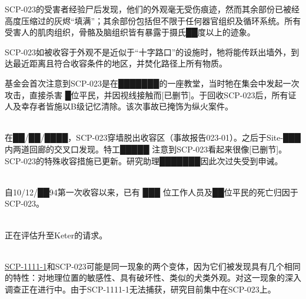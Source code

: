 SCP-023的受害者经验尸后发现，他们的外观毫无受伤痕迹，然而其余部份已被经高度压缩过的灰烬“填满”；其余部份包括但不限于任何器官组织及循环系统。所有受害人的肌肉组织，骨骼及脑组织皆有暴露于摄氏██度以上的迹象。

SCP-023如被收容于外观不是近似于“十字路口”的设施时，牠将能传跃出墙外，到达最近距离且符合收容条件的地区，并焚化路径上所有物质。

基金会首次注意到SCP-023是在███████的一座教堂，当时牠在集会中发起一次攻击，直接杀害 █位平民，并因视线接触而[已删节]。于回收SCP-023后，所有证人及幸存者皆施以B级记忆清除。该次事故已掩饰为纵火案件。

\\
在██\slash ██\slash ████，SCP-023穿墙脱出收容区（事故报告023-01）。之后于Site-███内两道回廊的交叉口发现。特工█████ 注意到SCP-023看起来很像[已删节]。SCP-023的特殊收容措施已更新。研究助理███████因此次过失受到申诫。

\\
自10\slash 12\slash ██94第一次收容以来，已有 ███ 位工作人员及██位平民的死亡归因于SCP-023。

\\
正在评估升至Keter的请求。

\\
\hyperref[chap:SCP-1111]{SCP-1111-1}和SCP-023可能是同一现象的两个变体，因为它们被发现具有几个相同的特性：对地理位置的敏感性、具有破坏性、类似的犬类外观。对这一现象的深入调查正在进行中。由于SCP-1111-1无法捕获，研究目前集中在SCP-023上。

\newpage


\newpage

